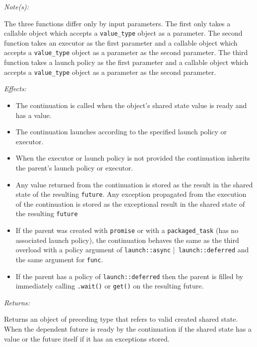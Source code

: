 \documentclass[a4paper,10pt]{article}
\newcommand{\cpp}[1]{\lstinline{#1}}
\newcommand{\wordingItem}[1]{\noindent\textit{#1:}}
\newenvironment{wordingPara}{\begin{adjustwidth}{12pt}{}}{\end{adjustwidth}}
\newenvironment{Effects}{\wordingItem{Effects}\vspace{7pt}\noindent\begin{adjustwidth}{12pt}{}}{\vspace{7pt}\end{adjustwidth}}
\newenvironment{Returns}{\wordingItem{Returns}\vspace{7pt}\noindent\begin{adjustwidth}{12pt}{}}{\vspace{7pt}\end{adjustwidth}}
\newenvironment{Notes}{\wordingItem{Note(s)}\vspace{7pt}\noindent\begin{adjustwidth}{12pt}{}}{\vspace{7pt}\end{adjustwidth}}
\begin{document}
\begin{wordingPara}

\begin{Notes}
The three functions differ only by input parameters. The first only takes a callable object which accepts a \cpp{value_type} object as a parameter. The second function takes an executor as the first parameter and a callable object which accepts a \cpp{value_type} object as a parameter as the second parameter. The third function takes a launch policy as the first parameter and a callable object which accepts a \cpp{value_type} object as a parameter as the second parameter.
\end{Notes}

\begin{Effects}
\begin{itemize}

\item The continuation is called when the object's shared state value is ready and has a value. 
\item The continuation launches according to the specified launch policy or executor. 
\item When the executor or launch policy is not provided the continuation inherits the parent's 
launch policy or executor. 
\item Any value returned from the continuation is stored as the result in the shared state of the resulting \cpp{future}. 
Any exception propagated from the execution of the continuation is stored as the exceptional result in the shared state of the resulting \cpp{future}
\item If the parent was created with \cpp{promise} or with a \cpp{packaged_task} (has no associated launch 
policy), the continuation behaves the same as the third overload with a policy argument of 
\cpp{launch::async} |\cpp{ launch::deferred} and the same argument for \cpp{func}.
 
\item If the parent has a policy of \cpp{launch::deferred} then the parent is filled by immediately calling \cpp{.wait()} or \cpp{get()} on the resulting future. 

\end{itemize}
\end{Effects}

\begin{Returns}
Returns an object of preceding type that refers to valid created shared state. When the dependent future is ready by 
the continuation if the shared state has a value or the future itself if it has an exceptions stored. 
\end{Returns}


\end{wordingPara}
\end{document}
